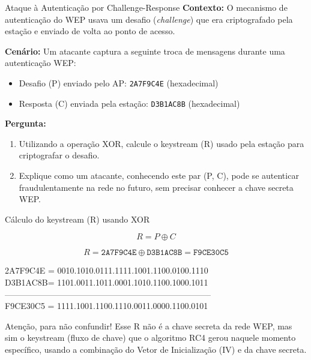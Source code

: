 \begin{frame}{Ataque à Autenticação por Challenge-Response}
\textbf{Contexto:} O mecanismo de autenticação do WEP usava um desafio (\textit{challenge}) que era criptografado pela estação e enviado de volta ao ponto de acesso.

\medskip
\textbf{Cenário:} Um atacante captura a seguinte troca de mensagens durante uma autenticação WEP:

\begin{itemize}
    \item Desafio (P) enviado pelo AP: \texttt{2A7F9C4E} (hexadecimal)
    \item Resposta (C) enviada pela estação: \texttt{D3B1AC8B} (hexadecimal)
\end{itemize}


\textbf{Pergunta:}
\begin{enumerate}


    \item Utilizando a operação XOR, calcule o keystream (R) usado pela estação para criptografar o desafio.

    \item Explique como um atacante, conhecendo este par (P, C), pode se autenticar fraudulentamente na rede no futuro, sem precisar conhecer a chave secreta WEP.
\end{enumerate}

\end{frame}


\begin{frame}{Cálculo do keystream (R) usando XOR}

\[
R = P \oplus C
\]

\[
R = \texttt{2A7F9C4E} \oplus \texttt{D3B1AC8B} = \texttt{F9CE30C5}
\]

2A7F9C4E =  0010.1010.0111.1111.1001.1100.0100.1110\\
D3B1AC8B= 1101.0011.1011.0001.1010.1100.1000.1011\\
--------------------------------------------------------------------------\\
F9CE30C5 = 1111.1001.1100.1110.0011.0000.1100.0101

\begin{block}{Atenção, para não confundir!}
    Esse R não é a chave secreta da rede WEP, mas sim o keystream (fluxo de chave) que o algoritmo RC4 gerou naquele momento específico, usando a combinação do Vetor de Inicialização (IV) e da chave secreta.
\end{block}
\end{frame}

